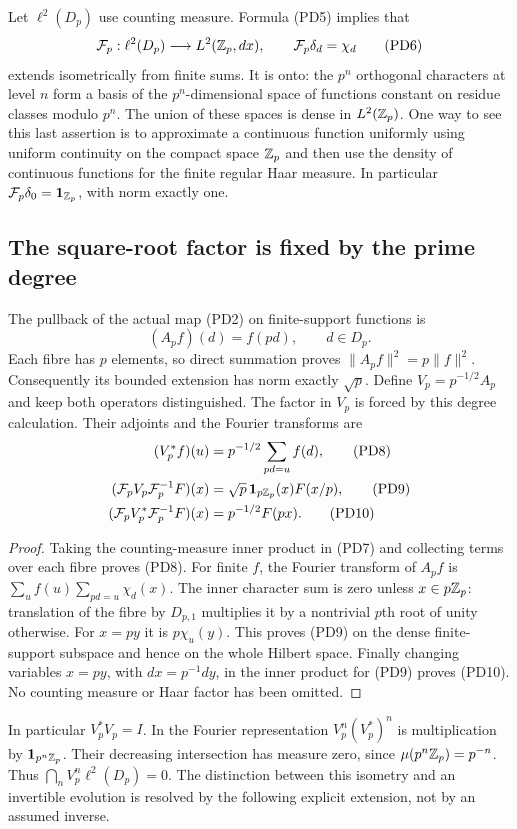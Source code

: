 Let $\ell^2(D_p)$ use counting measure. Formula (PD5) implies that
\[
 \mathcal F_p:\ell^2(D_p)\longrightarrow L^2(\mathbb Z_p,dx),\qquad
 \mathcal F_p\delta_d=\chi_d
 \tag{PD6}
\]
extends isometrically from finite sums. It is onto: the $p^n$ orthogonal
characters at level $n$ form a basis of the $p^n$-dimensional space of
functions constant on residue classes modulo $p^n$. The union of these
spaces is dense in $L^2(\mathbb Z_p)$. One way to see this last assertion is
to approximate a continuous function uniformly using uniform continuity
on the compact space $\mathbb Z_p$ and then use the density of continuous
functions for the finite regular Haar measure. In particular
$\mathcal F_p\delta_0=\mathbf1_{\mathbb Z_p}$, with norm exactly one.

\subsection{The square-root factor is fixed by the prime degree}
The pullback of the actual map (PD2) on finite-support functions is
\[
 (A_pf)(d)=f(pd),\qquad d\in D_p.
 \tag{PD7}
\]
Each fibre has $p$ elements, so direct summation proves
$\|A_pf\|^2=p\|f\|^2$. Consequently its bounded extension has
norm exactly $\sqrt p$. Define
$V_p=p^{-1/2}A_p$ and keep both operators distinguished. The factor
in $V_p$ is forced by this degree calculation.
Their adjoints and the Fourier transforms are
\begin{align}
 (V_p^*f)(u)&=p^{-1/2}\sum_{pd=u}f(d),\tag{PD8}\\
 (\mathcal F_pV_p\mathcal F_p^{-1}F)(x)
 &=\sqrt p\,\mathbf1_{p\mathbb Z_p}(x)F(x/p),\tag{PD9}\\
 (\mathcal F_pV_p^*\mathcal F_p^{-1}F)(x)
 &=p^{-1/2}F(px).\tag{PD10}
\end{align}
\begin{proof}
Taking the counting-measure inner product in (PD7) and collecting terms
over each fibre proves (PD8). For finite $f$, the Fourier transform of
$A_pf$ is
$\sum_u f(u)\sum_{pd=u}\chi_d(x)$. The inner character sum is zero
unless $x\in p\mathbb Z_p$: translation of the fibre by $D_{p,1}$ multiplies
it by a nontrivial $p$th root of unity otherwise. For $x=py$ it is
$p\chi_u(y)$. This proves (PD9) on the dense finite-support subspace
and hence on the whole Hilbert space. Finally changing variables
$x=py$, with $dx=p^{-1}dy$, in the inner product for (PD9) proves
(PD10). No counting measure or Haar factor has been omitted.
\end{proof}

In particular $V_p^*V_p=I$. In the Fourier representation
$V_p^n(V_p^*)^n$ is multiplication by $\mathbf1_{p^n\mathbb Z_p}$.
Their decreasing intersection has measure zero, since
$\mu(p^n\mathbb Z_p)=p^{-n}$. Thus $\bigcap_nV_p^n\ell^2(D_p)=0$.
The distinction between this isometry and an invertible evolution is
resolved by the following explicit extension, not by an assumed inverse.

